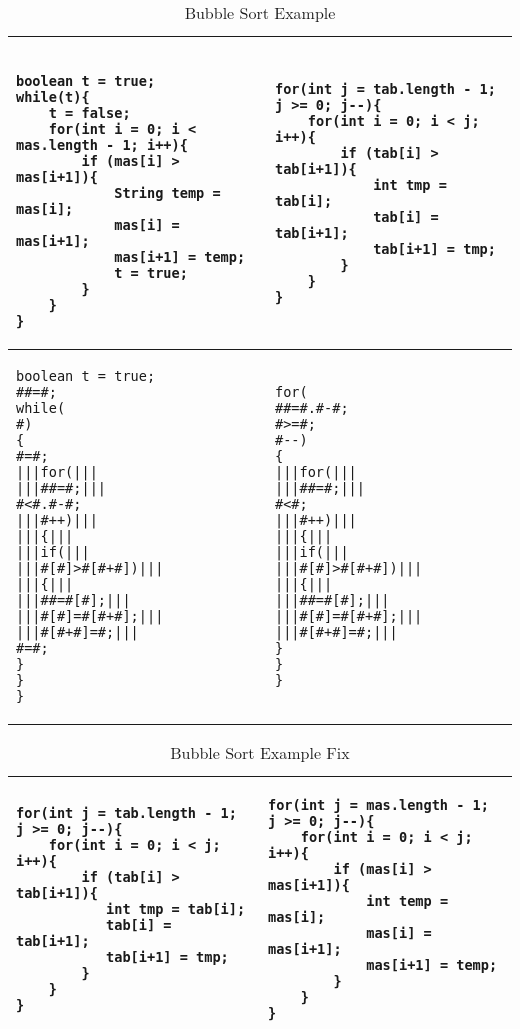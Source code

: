 \begin{table*}[]
\centering
\caption{Bubble Sort Example}
\label{tab:bubble}
\begin{tabular}{l|l}

\hline

\begin{lstlisting}[moredelim={[is][\color{red}]{|||}{|||}}]

boolean t = true;
while(t){
    t = false;
    for(int i = 0; i < mas.length - 1; i++){
        if (mas[i] > mas[i+1]){
            String temp = mas[i];
            mas[i] = mas[i+1];
            mas[i+1] = temp;
            t = true;
        }
    }
}
\end{lstlisting}&
\begin{lstlisting}[moredelim={[is][\color{red}]{|||}{|||}}]
for(int j = tab.length - 1; j >= 0; j--){
    for(int i = 0; i < j; i++){
        if (tab[i] > tab[i+1]){
            int tmp = tab[i];
            tab[i] = tab[i+1];
            tab[i+1] = tmp;
        }
    }
}
\end{lstlisting}
\\ \hline
\begin{lstlisting}[moredelim={[is][\color{red}]{|||}{|||}}]
boolean t = true;
##=#;
while(
#)
{
#=#;
|||for(|||
|||##=#;|||
#<#.#-#;
|||#++)|||
|||{|||
|||if(|||
|||#[#]>#[#+#])|||
|||{|||
|||##=#[#];|||
|||#[#]=#[#+#];|||
|||#[#+#]=#;|||
#=#;
}
}
}
\end{lstlisting}&
\begin{lstlisting}[moredelim={[is][\color{red}]{|||}{|||}}]
for(
##=#.#-#;
#>=#;
#--)
{
|||for(|||
|||##=#;|||
#<#;
|||#++)|||
|||{|||
|||if(|||
|||#[#]>#[#+#])|||
|||{|||
|||##=#[#];|||
|||#[#]=#[#+#];|||
|||#[#+#]=#;|||
}
}
}
\end{lstlisting}
\\ \hline
\end{tabular}
\end{table*}

\begin{table*}[]
\centering
\caption{Bubble Sort Example Fix}
\label{tab:bubble-fix}
\begin{tabular}{l|l}
\hline
\begin{lstlisting}[moredelim={[is][\color{red}]{|||}{|||}}]
for(int j = tab.length - 1; j >= 0; j--){
    for(int i = 0; i < j; i++){
        if (tab[i] > tab[i+1]){
           int tmp = tab[i];
           tab[i] = tab[i+1];
           tab[i+1] = tmp;
        }
    }
}
\end{lstlisting}&
\begin{lstlisting}[moredelim={[is][\color{red}]{|||}{|||}}]
for(int j = mas.length - 1; j >= 0; j--){
    for(int i = 0; i < j; i++){
        if (mas[i] > mas[i+1]){
            int temp = mas[i];
            mas[i] = mas[i+1];
            mas[i+1] = temp;
        }
    }
}
\end{lstlisting}
\\ \hline
\end{tabular}
\end{table*}

